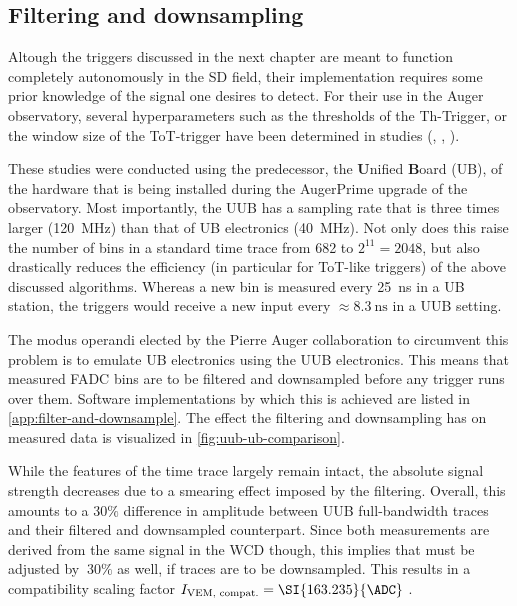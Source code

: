 \subsection{Filtering and downsampling}
\label{ssec:filtering-and-downsampling}

Altough the triggers discussed in the next chapter are meant to function completely autonomously in the SD field, their implementation requires some prior 
knowledge of the signal one desires to detect. For their use in the Auger observatory, several hyperparameters such as the thresholds of the Th-Trigger, or the 
window size of the ToT-trigger have been determined in studies (\cite{bertou2006calibration}, \cite{triggerSettings}, \cite{ToTtriggerSetting}). 

These studies were conducted using the predecessor, the \textbf{U}nified \textbf{B}oard (UB), of the hardware that is being installed during the AugerPrime upgrade
of the observatory. Most importantly, the UUB has a sampling rate that is three times larger (\SI{120}{\mega\hertz}) than that of UB electronics 
(\SI{40}{\mega\hertz}). Not only does this raise the number of bins in a standard time trace from 682 to $2^{11} = 2048$, but also drastically reduces the 
efficiency (in particular for ToT-like triggers) of the above discussed algorithms. Whereas a new  bin is measured every \SI{25}{\nano\second} in a UB station, the
triggers would receive a new input every $\approx\SI{8.3}{\nano\second}$ in a UUB setting.

The modus operandi elected by the Pierre Auger collaboration to circumvent this problem is to emulate UB electronics using the UUB electronics. This means that 
measured FADC bins are to be filtered and downsampled before any trigger runs over them. Software implementations by which this is achieved are listed in 
\autoref{app:filter-and-downsample}. The effect the filtering and downsampling has on measured data is visualized in \autoref{fig:uub-ub-comparison}.

While the features of the time trace largely remain intact, the absolute signal strength decreases due to a smearing effect imposed by the filtering. Overall, this
amounts to a $30\%$ difference in amplitude between UUB full-bandwidth traces and their filtered and downsampled counterpart. Since both measurements are derived 
from the same signal in the WCD though, this implies that \Ipeak must be adjusted by $~30\%$ as well, if traces are to be downsampled. This results in a 
compatibility scaling factor $I_\text{VEM, compat.} = \SI{163.235}{\ADC}$ \cite{OfflineSource}.

